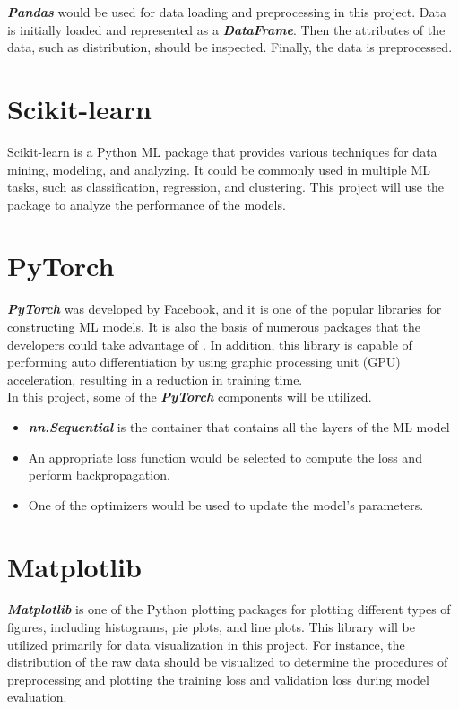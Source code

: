 \documentclass[12pt,twoside]{report}
\begin{document}
\textbf{\textit{Pandas}} would be used for data loading and preprocessing in this project. Data is initially loaded and represented as a \textbf{\textit{DataFrame}}. Then the attributes of the data, such as distribution, should be inspected. Finally, the data is preprocessed.

\section{Scikit-learn}
Scikit-learn is a Python ML package that provides various techniques for data mining, modeling, and analyzing. It could be commonly used in multiple ML tasks, such as classification, regression, and clustering. This project will use the package to analyze the performance of the models.

\section{PyTorch}
\textbf{\textit{PyTorch}} was developed by Facebook, and it is one of the popular libraries for constructing ML models. It is also the basis of numerous packages that the developers could take advantage of \citep{RN5}. In addition, this library is capable of performing auto differentiation by using graphic processing unit (GPU) acceleration, resulting in a reduction in training time. 
\\

In this project, some of the \textbf{\textit{PyTorch}} components will be utilized.
\begin{itemize}
	\item \textbf{\textit{nn.Sequential}} is the container that contains all the layers of the ML model
	\item An appropriate loss function would be selected to compute the loss and perform backpropagation. 
	\item One of the optimizers would be used to update the model's parameters. 
\end{itemize}

\section{Matplotlib}
\textbf{\textit{Matplotlib}} is one of the Python plotting packages for plotting different types of figures, including histograms, pie plots, and line plots. This library will be utilized primarily for data visualization in this project. For instance, the distribution of the raw data should be visualized to determine the procedures of preprocessing and plotting the training loss and validation loss during model evaluation. 
\end{document}
